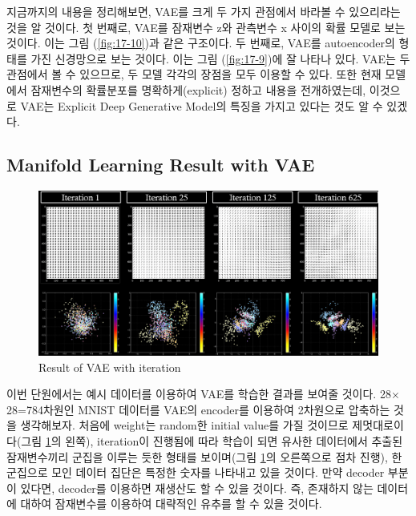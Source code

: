 \documentclass[draft=false]{oblivoir}
\begin{document}
지금까지의 내용을 정리해보면, VAE를 크게 두 가지 관점에서 바라볼 수 있으리라는 것을 알 것이다. 첫 번째로, VAE를 잠재변수 z와 관측변수 x 사이의 확률 모델로 보는 것이다. 이는 그림 (\ref{fig:17-10})과 같은 구조이다. 두 번째로, VAE를 autoencoder의 형태를 가진 신경망으로 보는 것이다. 이는 그림 (\ref{fig:17-9})에 잘 나타나 있다. VAE는 두 관점에서 볼 수 있으므로, 두 모델 각각의 장점을 모두 이용할 수 있다. 또한 현재 모델에서 잠재변수의 확률분포를 명확하게(explicit) 정하고 내용을 전개하였는데, 이것으로 VAE는 Explicit Deep Generative Model의 특징을 가지고 있다는 것도 알 수 있겠다.

\subsection{Manifold Learning Result with VAE}

\begin{figure}[ht] \centering
  \includegraphics[scale=0.7]{fig11.png}
  \caption{Result of VAE with iteration}
  \label{fig:17-11}
\end{figure}

이번 단원에서는 예시 데이터를 이용하여 VAE를 학습한 결과를 보여줄 것이다. 28$\times$28=784차원인 MNIST 데이터를 VAE의 encoder를 이용하여 2차원으로 압축하는 것을 생각해보자. 처음에 weight는 random한 initial value를 가질 것이므로 제멋대로이다(그림 \ref{fig:17-11}의 왼쪽), iteration이 진행됨에 따라 학습이 되면 유사한 데이터에서 추출된 잠재변수끼리 군집을 이루는 듯한 형태를 보이며(그림 \ref{fig:17-11}의 오른쪽으로 점차 진행), 한 군집으로 모인 데이터 집단은 특정한 숫자를 나타내고 있을 것이다. 만약 decoder 부분이 있다면, decoder를 이용하면 재생산도 할 수 있을 것이다. 즉, 존재하지 않는 데이터에 대하여 잠재변수를 이용하여 대략적인 유추를 할 수 있을 것이다.

\end{document}
